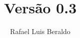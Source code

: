 \documentclass[openany,a4paper]{book}
\author{Rafael Luis Beraldo}
\title{
	{\Huge \caps{O (Pequeno) Manual de \LaTeX{} do Linguista Contempor\~aneo}} \\
	{\small Versão 0.3}
}
\begin{document}
\maketitle
\tableofcontents
%








\printglossaries

\end{document}
